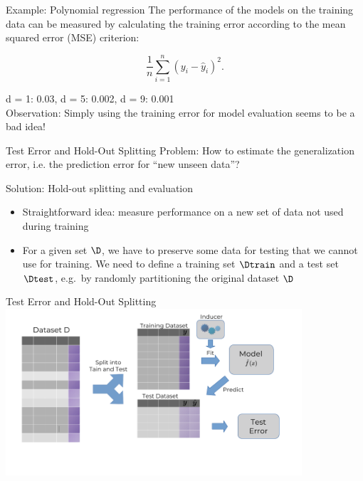 \begin{frame}{Example: Polynomial regression}
The performance of the models on the training data can be measured by
calculating the training error according to the mean squared
error (MSE) criterion:

\[ \frac{1}{n} \sum_{i = 1}^{n}(y_i - \hat{y}_i)^2\text{.} \]

d = 1: 0.03, \qquad d = 5: 0.002, \qquad d = 9: 0.001 \\

\vfill
Observation: Simply using the training error for model evaluation seems to be a bad idea!
\end{frame}


\begin{frame}{Test Error and Hold-Out Splitting}
Problem: How to estimate the generalization error, i.e. the prediction error for  \enquote{new unseen data}?

Solution: Hold-out splitting and evaluation

\begin{itemize}
\item Straightforward idea:
 measure performance on a new set of data not used during training
\item For a given set \(\D\), we have to preserve some data for testing that
  we cannot use for training. We need to define a training set \(\Dtrain\) and a test set \(\Dtest\), e.g.~by randomly partitioning the original dataset \(\D\)
\end{itemize}
\end{frame}


\begin{frame}{Test Error and Hold-Out Splitting}
\includegraphics[width=11cm]{plots/test_error.png}
\end{frame}


